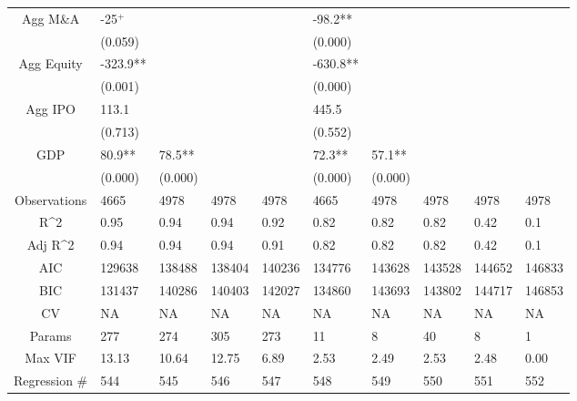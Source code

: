 \documentclass{article}
\begin{document}
\begin{table}[H]
\begin{tabular}{|clllllllll|}
  Agg M\&A & -25$^{+}$ &  &  &  & -98.2** &  &  &  &  \\ 
   & (0.059) &  &  &  & (0.000) &  &  &  &  \\ 
  Agg Equity & -323.9** &  &  &  & -630.8** &  &  &  &  \\ 
   & (0.001) &  &  &  & (0.000) &  &  &  &  \\ 
  Agg IPO & 113.1 &  &  &  & 445.5 &  &  &  &  \\ 
   & (0.713) &  &  &  & (0.552) &  &  &  &  \\ 
  GDP & 80.9** & 78.5** &  &  & 72.3** & 57.1** &  &  &  \\ 
   & (0.000) & (0.000) &  &  & (0.000) & (0.000) &  &  &  \\ 
  \hline 
 Observations & 4665 & 4978 & 4978 & 4978 & 4665 & 4978 & 4978 & 4978 & 4978 \\ 
  R^2 & 0.95 & 0.94 & 0.94 & 0.92 & 0.82 & 0.82 & 0.82 & 0.42 & 0.1 \\ 
  Adj R^2 & 0.94 & 0.94 & 0.94 & 0.91 & 0.82 & 0.82 & 0.82 & 0.42 & 0.1 \\ 
  AIC & 129638 & 138488 & 138404 & 140236 & 134776 & 143628 & 143528 & 144652 & 146833 \\ 
  BIC & 131437 & 140286 & 140403 & 142027 & 134860 & 143693 & 143802 & 144717 & 146853 \\ 
  CV & NA & NA & NA & NA & NA & NA & NA & NA & NA \\ 
  Params & 277 & 274 & 305 & 273 & 11 & 8 & 40 & 8 & 1 \\ 
  Max VIF & 13.13 & 10.64 & 12.75 & 6.89 & 2.53 & 2.49 & 2.53 & 2.48 & 0.00 \\ 
  Regression \# & 544 & 545 & 546 & 547 & 548 & 549 & 550 & 551 & 552 \\ 
   \hline
\end{tabular}
 
\end{table}
\end{document}
